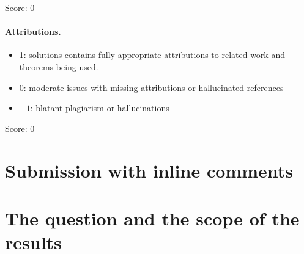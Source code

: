 \documentclass[11pt]{article}
\theoremstyle{definition}
\theoremstyle{remark}
\begin{document}
\noindent Score: 0

\paragraph{Attributions.}
\begin{itemize}
	\item  1: solutions contains fully appropriate attributions
		to related work and theorems being used.
	\item  0: moderate issues with missing attributions or hallucinated references
	\item  $-1$: blatant plagiarism or hallucinations
\end{itemize}

\noindent Score: $0$

\newpage
\section{Submission with inline comments}


\begin{abstract}
We consider deformations of a smooth totally geodesic surface in the moduli space of curves, with smoothly trivial intersections with every boundary stratum and a compatibility condition on incidences in fixed open sets. The question is whether a pointed component that is constant along a boundary curve must also be constant in the deformation parameter. We prove that, if this selected factor changes, compatibility forces the whole boundary curve into the closures of all larger incident boundary strata. If the compactified fibers are algebraic surfaces with no component contained in the boundary, this proves the desired constancy for strata with at least two nodes. A second criterion proves constancy whenever the boundary curves have a common stable limit; isolated-point conditions imply this criterion in several cases. We also analyze the ambiguity at a two-node separating chain and give examples delimiting compactification and lifting arguments. The original assertion, without the additional conditions in these criteria, remains unresolved here.
\end{abstract}

\section{The question and the scope of the results}
\end{document}
